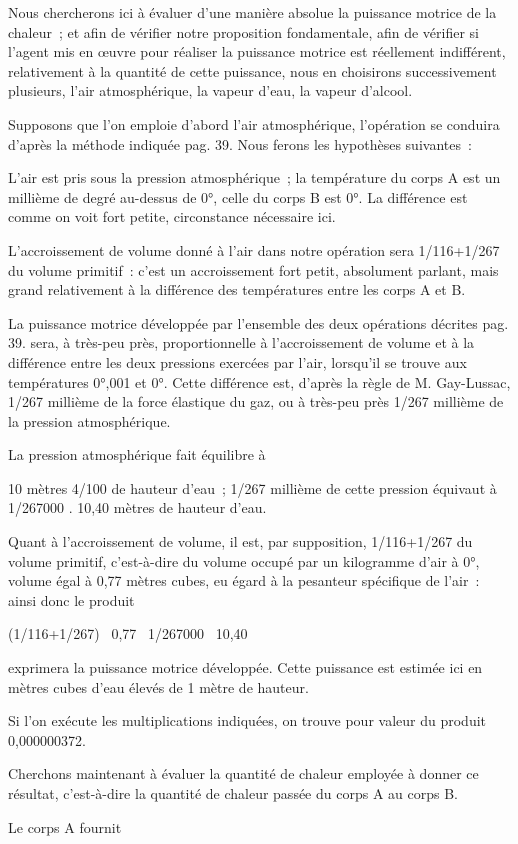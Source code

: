 \documentclass[french,twoside]{book} %
\begin{document}
Nous chercherons ici à évaluer d’une manière absolue la puissance motrice de la chaleur ; et afin de vérifier notre proposition fondamentale, afin de vérifier si l’agent mis en œuvre pour réaliser la puissance motrice est réellement indifférent, relativement à la quantité de cette puissance, nous en choisirons successivement plusieurs, l’air atmosphérique, la vapeur d’eau, la vapeur d’alcool.\par
Supposons que l’on emploie d’abord l’air atmosphérique, l’opération se conduira d’après la méthode indiquée pag. 39. Nous ferons les hypothèses suivantes :\par
L’air est pris sous la pression atmosphérique ; la température du corps A est un millième de degré au-dessus de 0°, celle du corps B est 0°. La différence est comme on voit fort petite, circonstance nécessaire ici.\par
L’accroissement de volume donné à l’air dans notre opération sera 1/116+1/267 du volume primitif : c’est un accroissement fort petit, absolument parlant, mais grand relativement à la différence des températures entre les corps A et B.\par
La puissance motrice développée par l’ensemble des deux opérations décrites pag. 39. sera, à très-peu près, proportionnelle à l’accroissement de volume et à la différence entre les deux pressions exercées par l’air, lorsqu’il se trouve aux températures 0°,001 et 0°. Cette différence est, d’après la règle de M. Gay-Lussac, 1/267 millième de la force élastique du gaz, ou à très-peu près 1/267 millième de la pression atmosphérique.\par
La pression atmosphérique fait équilibre à\par
10 mètres 4/100 de hauteur d’eau ; 1/267 millième de cette pression équivaut à 1/267000 . 10,40 mètres de hauteur d’eau.\par
Quant à l’accroissement de volume, il est, par supposition, 1/116+1/267 du volume primitif, c’est-à-dire du volume occupé par un kilogramme d’air à 0°, volume égal à 0,77 mètres cubes, eu égard à la pesanteur spécifique de l’air : ainsi donc le produit\par

\begin{center}
\noindent (1/116+1/267)  0,77  1/267000  10,40\par
\end{center}

\noindent exprimera la puissance motrice développée. Cette puissance est estimée ici en mètres cubes d’eau élevés de 1 mètre de hauteur.\par
Si l’on exécute les multiplications indiquées, on trouve pour valeur du produit 0,000000372.\par
Cherchons maintenant à évaluer la quantité de chaleur employée à donner ce résultat, c’est-à-dire la quantité de chaleur passée du corps A au corps B.\par
Le corps A fournit\par
\end{document}
